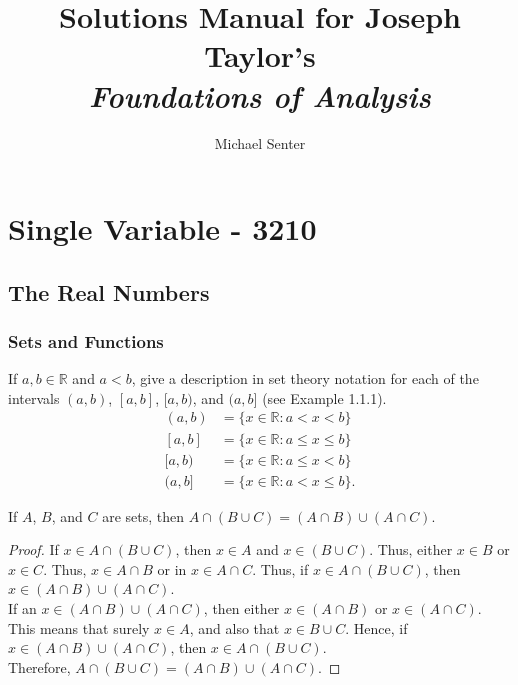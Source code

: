 \documentclass[12pt]{book}
\newenvironment{theorem}[2][Theorem]{\begin{trivlist}
\item[\hskip \labelsep {\bfseries #1}\hskip \labelsep {\bfseries #2.}]}{\end{trivlist}}
\newenvironment{exercise}[2][Exercise]{\begin{trivlist}
\item[\hskip \labelsep {\bfseries #1}\hskip \labelsep {\bfseries #2.}]}{\end{trivlist}}
\begin{document}

\title{Solutions Manual for Joseph Taylor's \\ \emph{Foundations of Analysis}}%
\author{Michael Senter}
\date{}

\maketitle

\part{Single Variable - 3210}


\chapter{The Real Numbers}

\section{Sets and Functions}

\begin{exercise}{1.1.1} %
If $a, b \in \mathbb{R}$ and $a < b$, give a description in set theory notation for each of the intervals $(a, b)$, $[a, b]$, $[a, b)$, and $(a, b]$ (see Example 1.1.1).
\begin{align*}
	(a,b) &= \{x \in \mathbb{R} : a < x < b\} \\
	[a,b] &= \{x \in \mathbb{R} : a \leq x \leq b\} \\
	[a,b) &= \{x \in \mathbb{R} : a \leq x < b\} \\
	(a,b] &= \{x \in \mathbb{R} : a < x \leq b\}.
\end{align*}
\end{exercise}

\begin{theorem}{1.1.2}
If $A$, $B$, and $C$ are sets, then $A  \cap (B \cup C) = (A \cap B) \cup (A \cap C)$.
\end{theorem}
\begin{proof}
If  $x \in A  \cap (B \cup C)$, then $x \in A$ and $x \in (B \cup C)$. Thus, either $x \in B$ or $x \in C$. Thus, $x \in A \cap B$ or in $x \in A \cap C$. Thus, if $x \in A  \cap (B \cup C)$, then $x \in (A \cap B) \cup (A \cap C)$. \\
If an $x \in (A \cap B) \cup (A \cap C)$, then either $x \in (A \cap B)$ or $x \in (A \cap C)$. This means that surely $x \in A$, and also that $x \in B \cup C$. Hence, if $x \in (A \cap B) \cup (A \cap C)$, then $x \in A  \cap (B \cup C)$.\\ 
Therefore, $A  \cap (B \cup C) = (A \cap B) \cup (A \cap C)$.
\end{proof}
\end{document}
